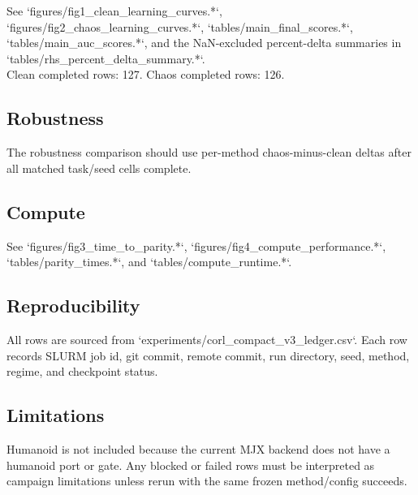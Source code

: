 \documentclass{article}
\begin{document}
See `figures/fig1\_clean\_learning\_curves.*`, `figures/fig2\_chaos\_learning\_curves.*`, `tables/main\_final\_scores.*`, `tables/main\_auc\_scores.*`, and the NaN-excluded percent-delta summaries in `tables/rhs\_percent\_delta\_summary.*`.\\

Clean completed rows: 127. Chaos completed rows: 126.\\

\subsection*{Robustness}

The robustness comparison should use per-method chaos-minus-clean deltas after all matched task/seed cells complete.\\

\subsection*{Compute}

See `figures/fig3\_time\_to\_parity.*`, `figures/fig4\_compute\_performance.*`, `tables/parity\_times.*`, and `tables/compute\_runtime.*`.\\

\subsection*{Reproducibility}

All rows are sourced from `experiments/corl\_compact\_v3\_ledger.csv`. Each row records SLURM job id, git commit, remote commit, run directory, seed, method, regime, and checkpoint status.\\

\subsection*{Limitations}

Humanoid is not included because the current MJX backend does not have a humanoid port or gate. Any blocked or failed rows must be interpreted as campaign limitations unless rerun with the same frozen method/config succeeds.\\
\end{document}
